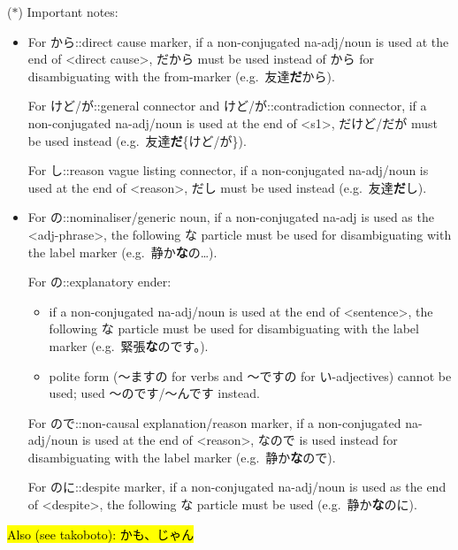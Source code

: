 \documentclass[../nihongo-gakushuu-kyouzai-grammar.tex]{subfiles}
\begin{document}
\color{red}
($*$) Important notes:
\begin{itemize}
    \item For から::direct cause marker, if a non-conjugated na-adj/noun is used at the end of <direct cause>, だから must be used instead of から for disambiguating with the from-marker (e.g.\ 友達\textbf{だ}から).

    For けど/が::general connector and けど/が::contradiction connector, if a non-conjugated na-adj/noun is used at the end of <s1>, だけど/だが must be used instead (e.g.\ 友達\textbf{だ}\{けど/が\}).

    For し::reason vague listing connector, if a non-conjugated na-adj/noun is used at the end of <reason>, だし must be used instead (e.g.\ 友達\textbf{だ}し).
    \item For の::nominaliser/generic noun, if a non-conjugated na-adj is used as the <adj-phrase>, the following な particle must be used for disambiguating with the label marker (e.g.\ 静か\textbf{な}の\dots).

    For の::explanatory ender:
    \begin{itemize}
        \item if a non-conjugated na-adj/noun is used at the end of <sentence>, the following な particle must be used for disambiguating with the label marker (e.g.\ 緊張\textbf{な}のです。).
        \item polite form (〜ますの for verbs and 〜ですの for い-adjectives) cannot be used; used 〜のです/〜んです instead.
    \end{itemize}

    For ので::non-causal explanation/reason marker, if a non-conjugated na-adj/noun is used at the end of <reason>, なので is used instead for disambiguating with the label marker (e.g.\ 静か\textbf{な}ので).

    For のに::despite marker, if a non-conjugated na-adj/noun is used as the end of <despite>, the following な particle must be used (e.g.\ 静か\textbf{な}のに).
\end{itemize}
\color{black}

\hl{Also (see takoboto): かも、じゃん}
\end{document}
